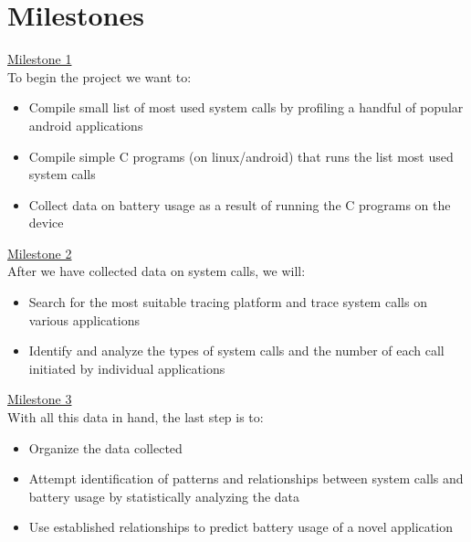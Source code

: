 \documentclass[11pt]{article}
\begin{document}
\section{Milestones}
\uline{Milestone 1}\\
To begin the project we want to: 
\begin{itemize}
  \item Compile small list of most used system calls by profiling a handful of popular android applications
  \item Compile simple C programs (on linux/android) that runs the list most used system calls
  \item Collect data on battery usage as a result of running the C programs on the device
\end{itemize}

\noindent
\uline{Milestone 2}\\
After we have collected data on system calls, we will:
\begin{itemize}
  \item Search for the most suitable tracing platform and trace system calls on various applications 
  \item Identify and analyze the types of system calls and the number of each call initiated by individual applications
\end{itemize}

\noindent
\uline{Milestone 3}\\
With all this data in hand, the last step is to:
\begin{itemize}
  \item Organize the data collected
  \item Attempt identification of patterns and relationships between system calls and battery usage by statistically analyzing the data
  \item Use established relationships to predict battery usage of a novel application
\end{itemize}



\end{document}

